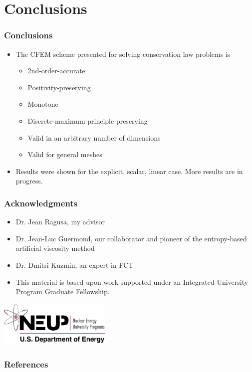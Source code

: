 \documentclass{beamer}
\begin{document}
\section{Conclusions}
\begin{frame}
\frametitle{Conclusions}

\begin{itemize}
   \item The CFEM scheme presented for solving conservation law problems is
   \begin{itemize}
      \item 2nd-order-accurate
      \item Positivity-preserving
      \item Monotone
      \item Discrete-maximum-principle preserving
      \item Valid in an arbitrary number of dimensions
      \item Valid for general meshes
   \end{itemize}
   \item Results were shown for the explicit, scalar, linear case. More results
      are in progress.
\end{itemize}

\end{frame}
\begin{frame}
\frametitle{Acknowledgments}

\begin{itemize}
   \item Dr. Jean Ragusa, my advisor
   \item Dr. Jean-Luc Guermond, our collaborator and pioneer of the entropy-based
      artificial viscosity method
   \item Dr. Dmitri Kuzmin, an expert in FCT
\end{itemize}
\begin{itemize}
   \item This material is based upon work supported under an Integrated University
      Program Graduate Fellowship.
\end{itemize}

\begin{center}
   \includegraphics[width=0.4\textwidth]{./figures/NEUP_Final_Logo_Version-09.jpg}
\end{center}
\end{frame}
\begin{frame}
\frametitle{References}




\end{frame}
\end{document}
